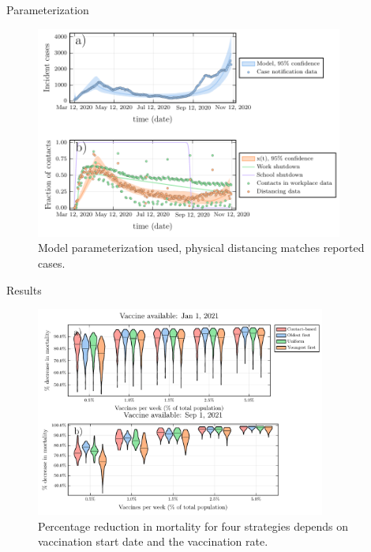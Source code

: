 \documentclass{beamer}
\begin{document}
\begin{frame}{Parameterization}
    \begin{figure}
    \includegraphics[width=0.9\textwidth]{covid/plot_model.pdf}
    \caption{Model parameterization used, physical distancing matches reported cases.}
    \end{figure}
\end{frame}
\begin{frame}{Results}
            \begin{figure}
                \includegraphics[width = 0.85\textwidth]{covid/vaccination_by_mortality_small.pdf}

                
                \caption{Percentage reduction in mortality for four strategies depends on vaccination start date and the vaccination rate.} %
            \end{figure}
\end{frame}
\end{document}

